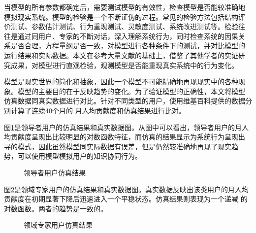 当模型的所有参数都确定后，需要测试模型的有效性，检查模型是否能较准确地
模拟现实系统。模型的检验是一个不断证伪的过程。常见的检验方法包括结构评
价测试、参数估计测试、行为重现测试、灵敏度测试、系统改进测试等。检验往
往是通过同用户、专家的不断对话，深入理解系统行为，同时检查系统的因果关
系是否合理，方程量纲是否一致，对模型进行各种条件下的测试，并对比模型的
运行结果和实际数据。本文在参考大量文献的基础上，借鉴了其他学者的实证研
究成果，对模型进行直观检验，观测模型是否能重现真实系统中的行为变化。

模型是现实世界的简化和抽象，因此一个模型不可能精确地再现现实中的各种现
象。模型的主要目的在于反映趋势的变化。为了验证模型的正确性，本文将模型
仿真数据同真实数据进行对比。针对不同类型的用户，使用维基百科提供的数据分别计算了连续40个月的
月人均贡献度和仿真结果进行比对。

图\ref{fig:simu1}是领导者用户的仿真结果和真实数据图。从图中可以看出，领导者用户的月人
均贡献度呈现出比较明显的对数函数特征，而仿真的结果显示为系统行为呈现出
寻的模式，因此虽然模型同实际数据有误差，但是仍然较准确地再现了现实趋
势，可以使用模型模拟用户的知识协同行为。

\begin{figure}[!htb]
  \centering
  \caption{\small{领导者用户仿真结果}}
  \label{fig:simu1}
\end{figure}

图\ref{fig:simu2}是领域专家用户的仿真结果和真实数据图。真实数据反映出该类用户的月人均
贡献度在初期显著下降后迅速进入一个平稳状态。仿真结果则表现为一个递减
的对数函数。两者的趋势是一致的。

\begin{figure}[!htb]
  \centering
  \caption{\small{领域专家用户仿真结果}}
  \label{fig:simu2}
\end{figure}

